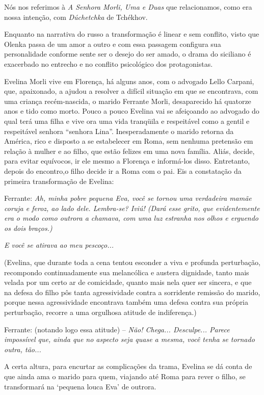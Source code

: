 Nós nos referimos à \emph{A Senhora Morli, Uma e Duas} que relacionamos,
como era nossa intenção, com \emph{Dúchetchka} de Tchékhov.

Enquanto na narrativa do russo a transformação é linear e sem conflito,
visto que Olenka passa de um amor a outro e com essa passagem configura
sua personalidade conforme sente ser o desejo do ser amado, o drama do
siciliano é exacerbado no entrecho e no conflito psicológico dos
protagonistas.

Evelina Morli vive em Florença, há alguns anos, com o advogado Lello
Carpani, que, apaixonado, a ajudou a resolver a difícil situação em que
se encontrava, com uma criança recém-nascida, o marido Ferrante Morli,
desaparecido há quatorze anos e tido como morto. Pouco a pouco Evelina
vai se afeiçoando ao advogado do qual terá uma filha e vive ora uma vida
tranqüila e respeitável como a gentil e respeitável senhora ``senhora
Lina''. Inesperadamente o marido retorna da América, rico e disposto a
se estabelecer em Roma, sem nenhuma pretensão em relação à mulher e ao
filho, que estão felizes em uma nova família. Aliás, decide, para evitar
equívocos, ir ele mesmo a Florença e informá-los disso. Entretanto,
depois do encontro,o filho decide ir a Roma com o pai. Eis a constatação
da primeira transformação de Evelina:

Ferrante: \emph{Ah, minha pobre pequena Eva, você se tornou uma
verdadeira mamãe coruja e feroz, ao lado dele. Lembra-se? Iviú! (Dará
esse grito, que evidentemente era o modo como outrora a chamava, com uma
luz estranha nos olhos e erguendo os dois braços.)}

\emph{E você se atirava ao meu pescoço...}

(Evelina, que durante toda a cena tentou esconder a viva e profunda
perturbação, recompondo continuadamente sua melancólica e austera
dignidade, tanto mais velada por um certo ar de comicidade, quanto mais
nela quer ser sincera, e que na defesa do filho pôs tanta agressividade
contra a sorridente remissão do marido, porque nessa agressividade
encontrava também uma defesa contra sua própria perturbação, recorre a
uma orgulhosa atitude de indiferença.)

Ferrante: (notando logo essa atitude) -- \emph{Não! Chega... Desculpe...
Parece impossível que, ainda que no aspecto seja quase a mesma, você
tenha se tornado outra, tão...}

A certa altura, para encurtar as complicações da trama, Evelina se dá
conta de que ainda ama o marido para quem, viajando até Roma para rever
o filho, se transformará na `pequena louca Eva' de outrora.

